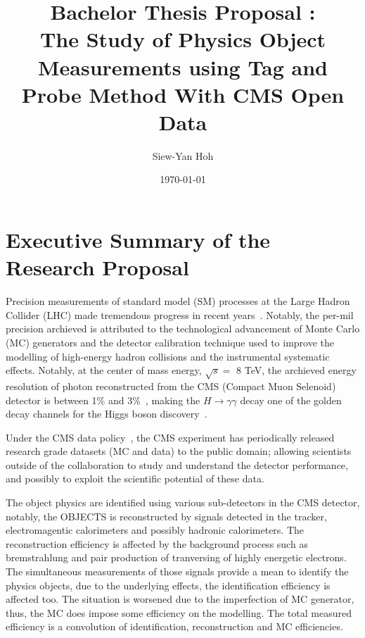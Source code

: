 \documentclass[bibliography=totoc]{article}
\title{Bachelor Thesis Proposal : \\ The Study of Physics Object Measurements using Tag and Probe Method With CMS Open Data}
\author{Siew-Yan Hoh}
\date{\today}
\begin{document}
\maketitle

\section{Executive Summary of the Research Proposal}

Precision measurements of standard model (SM) processes at the Large Hadron Collider (LHC) made tremendous progress in recent years~\cite{ATLAS:2016nqi,CMS:2014pkt,CMS:2013hon,ATLAS:2016rnf,ATLAS:2015iiu}. Notably, the per-mil precision archieved is attributed to the technological advancement of Monte Carlo (MC) generators and the detector calibration technique used to improve the modelling of high-energy hadron collisions and the instrumental systematic effects. Notably, at the center of mass energy, $\sqrt{s} = $ 8 TeV, the archieved energy resolution of photon reconstructed from the CMS (Compact Muon Selenoid) detector is between 1$\%$ and 3$\%$~\cite{2015pho}, making the $H \rightarrow \gamma \gamma$ decay one of the golden decay channels for the Higgs boson discovery~\cite{CMS:2012qbp}.

Under the CMS data policy~\cite{cmsopendata}, the CMS experiment has periodically released research grade datasets (MC and data) to the public domain; allowing scientists outside of the collaboration to study and understand the detector performance, and possibly to exploit the scientific potential of these data.

The object physics are identified using various sub-detectors in the CMS detector, notably, the OBJECTS is reconstructed by signals detected in the tracker, electromagentic calorimeters and possibly hadronic calorimeters. The reconstruction efficiency is affected by the background process such as bremstrahlung and pair production of tranversing of highly energetic electrons. The simultaneous measurements of those signals provide a mean to identify the physics objects, due to the underlying effects, the identification efficiency is affected too. The situation is worsened due to the imperfection of MC generator, thus, the MC does impose some efficiency on the modelling. The total measured efficiency is a convolution of identification, reconstruction and MC efficiencies.






%
%
\printbibliography
\end{document}
